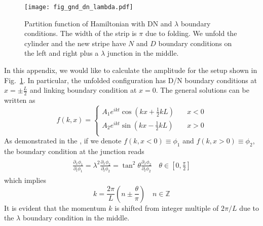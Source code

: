 
\begin{figure}[h]
\centering
\texttt{[image: fig\_gnd\_dn\_lambda.pdf]}
\caption{Partition function of Hamiltonian with DN and $\lambda$ boundary conditions. The width of the strip is $\pi$ due to folding. We unfold the cylinder and the new stripe have $N$ and $D$ boundary conditions on the left and right plus a $\lambda$ junction in the middle. }
\label{fig:Fig_gnd_dn_lambda}
\end{figure}

In this appendix, we would like to calculate the amplitude for the setup shown in Fig.~\ref{fig:Fig_gnd_dn_lambda}. In particular, the unfolded configuration has D/N boundary conditions at $x = \pm \frac{L}{2}$ and linking boundary condition at $x = 0$. The general solutions can be written as
\begin{equation}
\label{eq:normalized_f}
f(k, x) = 
\left\lbrace
\begin{aligned}
  A_1 e^{i kt} \cos\left(kx +\frac{1}{2}kL \right) &  \quad x < 0  \\
  A_2 e^{ikt}  \sin\left(kx - \frac{1}{2}kL \right) & \quad x > 0   \\
\end{aligned} \right. 
\end{equation}
As demonstrated in the , if we denote $f(k,x<0)\equiv\phi_1$ and $f(k,x>0)\equiv\phi_2$, the boundary condition at the junction reads
\begin{eqnarray}\begin{aligned}
\frac{\partial_x \phi_1}{ \partial_t \phi_1} = \lambda^2 \frac{\partial_x \phi_2}{ \partial_t \phi_2} = \tan^2 \theta\frac{\partial_x \phi_2}{ \partial_t \phi_2} \quad \theta \in \left[0,\frac{\pi}{2} \right]  
\end{aligned}\end{eqnarray}
which implies
\begin{equation}
\label{eq:momentum_gnd_dn_lambda}
k = \frac{2\pi}{L}\left( n \pm \frac{\theta}{\pi} \right)  \quad n\in\mathbb{Z}
\end{equation}
It is evident that the momentum $k$ is shifted from integer multiple of $2\pi/L$ due to the $\lambda$ boundary condition in the middle. 
